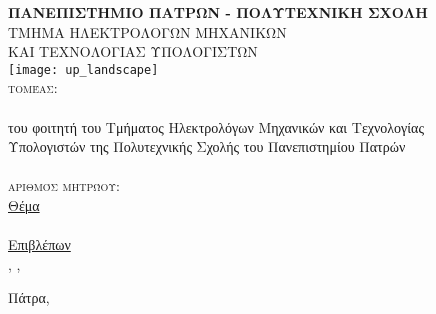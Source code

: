 \begin{titlepage}
\begin{center}
\textsc{\textbf{\large ΠΑΝΕΠΙΣΤΗΜΙΟ ΠΑΤΡΩΝ - ΠΟΛΥΤΕΧΝΙΚΗ ΣΧΟΛΗ}\\%
\large ΤΜΗΜΑ ΗΛΕΚΤΡΟΛΟΓΩΝ ΜΗΧΑΝΙΚΩΝ\\ΚΑΙ ΤΕΧΝΟΛΟΓΙΑΣ ΥΠΟΛΟΓΙΣΤΩΝ}\\

\texttt{[image: up\_landscape]}\\  

\textsc{\Large τομέας: \division}\\[1cm]

\textsc{\uline{\LARGE{\shortdoctitle}}}\\ [0.5cm]
του φοιτητή του Τμήματος Ηλεκτρολόγων Μηχανικών και Τεχνολογίας\\
Υπολογιστών της Πολυτεχνικής Σχολής  του Πανεπιστημίου Πατρών\\[1cm]

\textsc{\LARGE \me}\\[0.5cm]
\textsc{\Large αριθμός μητρώου: \studnum}\\[1cm]

\uline{\large Θέμα}\\[0.5cm]
\textbf{\large \doctitle}\\[1cm]
\uline{\large Επιβλέπων}\\[0.5cm]
\large \supname, \suptitle, \uoP\\[1cm]
\begin{center}
\end{center}
\vfill
\large{Πάτρα, \telosmonthyear}
\end{center}
\end{titlepage}